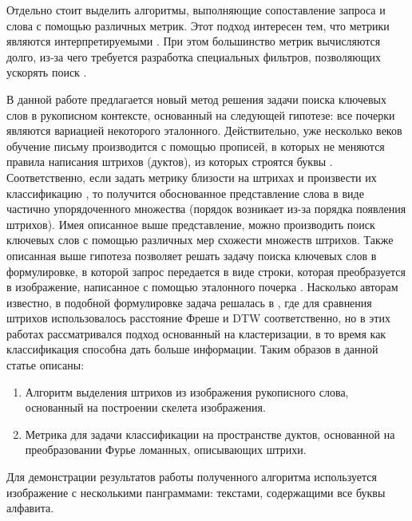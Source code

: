 \documentclass{article}
\begin{document}
\par Отдельно стоит выделить алгоритмы, выполняющие сопоставление запроса и слова с помощью различных метрик. Этот подход интересен тем, что метрики являются интерпретируемыми \citep{ameri2017keyword, stauffer2016graph}. При этом большинство метрик вычисляются долго, из-за чего требуется разработка специальных фильтров, позволяющих ускорять поиск \citep{stauffer2020filters}.
\par В данной работе предлагается новый метод решения задачи поиска ключевых слов в рукописном контексте, основанный на следующей гипотезе: все почерки являются вариацией некоторого эталонного. Действительно, уже несколько веков обучение письму производится с помощью прописей, в которых не меняются правила написания штрихов (дуктов), из которых строятся буквы \citep{austin2010}. Соответственно, если задать метрику близости на штрихах и произвести их классификацию \citep{pronina2023frechet, pazazia2023dtw}, то получится обоснованное представление слова в виде частично упорядоченного множества (порядок возникает из-за порядка появления штрихов). Имея описанное выше представление, можно производить поиск ключевых слов с помощью различных мер схожести множеств штрихов. Также описанная выше гипотеза позволяет решать задачу поиска ключевых слов в формулировке, в которой запрос передается в виде строки, которая преобразуется в изображение, написанное с помощью эталонного почерка \citep{retsinas2021from}. Насколько авторам известно, в подобной формулировке задача решалась в \citep{pronina2023frechet, pazazia2023dtw}, где для сравнения штрихов использовалось расстояние Фреше и DTW соответственно, но в этих работах рассматривался подход основанный на кластеризации, в то время как классификация способна дать больше информации. Таким образов в данной статье описаны:
\begin{enumerate}
\item Алгоритм выделения штрихов из изображения рукописного слова, основанный на построении скелета изображения.
\item Метрика для задачи классификации на пространстве дуктов, основанной на преобразовании Фурье ломанных, описывающих штрихи.
\end{enumerate}
Для демонстрации результатов работы полученного алгоритма используется изображение с несколькими панграммами: текстами, содержащими все буквы алфавита.
\end{document}
